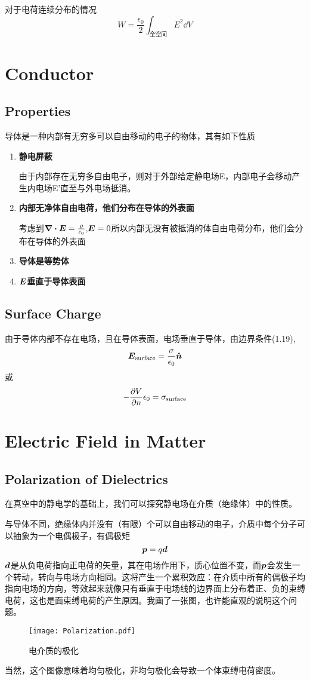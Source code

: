 \documentclass[14pt,oneside]{book}
\begin{document}
\begin{large}
对于电荷连续分布的情况
\begin{equation}
  W=\frac{\epsilon_0}{2}\int_{\text{全空间}} E^2 \dd V
\end{equation}
\section{Conductor}
\subsection{Properties}
导体是一种内部有无穷多可以自由移动的电子的物体，其有如下性质
\begin{enumerate}
  \item \textbf{静电屏蔽}
  
  由于内部存在无穷多自由电子，则对于外部给定静电场E，内部电子会移动产生内电场E'直至与外电场抵消。
  \item \textbf{内部无净体自由电荷，他们分布在导体的外表面}
  
  考虑到$\div{\vb*{E}}=\frac{\rho}{\epsilon_0}$,$\vb*{E}=0$所以内部无没有被抵消的体自由电荷分布，他们会分布在导体的外表面
  \item \textbf{导体是等势体}
  \item \textbf{$\vb*{E}$垂直于导体表面}
\end{enumerate}
\subsection{Surface Charge}
由于导体内部不存在电场，且在导体表面，电场垂直于导体，由边界条件(1.19),
\begin{equation}
  \vb*{E}_{\text{surface}}=\frac{\sigma}{\epsilon_0}\vb*{\hat{n}}
\end{equation}
或
\begin{equation}
  -\pdv{V}{n}\epsilon_0=\sigma_{\text{surface}}
\end{equation}
\section{Electric Field in Matter}
\subsection{Polarization of Dielectrics}
在真空中的静电学的基础上，我们可以探究静电场在介质（绝缘体）中的性质。

与导体不同，绝缘体内并没有（有限）个可以自由移动的电子，介质中每个分子可以抽象为一个电偶极子，有偶极矩
\begin{equation}
  \vb*{p}=q\vb*{d}
\end{equation}
$\vb*{d}$是从负电荷指向正电荷的矢量，其在电场作用下，质心位置不变，而$\vb*{p}$会发生一个转动，转向与电场方向相同。这将产生一个累积效应：在介质中所有的偶极子均指向电场的方向，等效起来就像只有垂直于电场线的边界面上分布着正、负的束缚电荷，这也是面束缚电荷的产生原因。我画了一张图，也许能直观的说明这个问题。
\begin{figure}[H]
\centering
  \texttt{[image: Polarization.pdf]}
  \caption{电介质的极化}
\end{figure}
当然，这个图像意味着均匀极化，非均匀极化会导致一个体束缚电荷密度。

\end{large}
\end{document}
